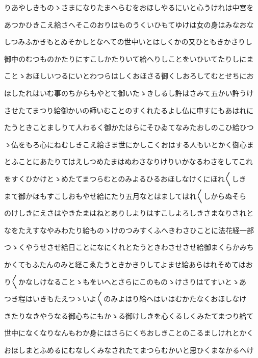 \documentclass[a4paper,11pt,landscape]{ltjtarticle}
\begin{document}
\par\medskip
りあやしきものゝさまになりたまへらむをおほしやるにいと心うけれは中宮を
\par\medskip
あつかひきこえ給さへそこのおりはものうくいひもてゆけは女の身はみなおな
\par\medskip
しつみふかきもとゐそかしとなへての世中いとはしくかの又ひともきかさりし
\par\medskip
御中のむつものかたりにすこしかたりいて給へりしことをいひいてたりしにま
\par\medskip
ことゝおほしいつるにいとわつらはしくおほさる御くしおろしてむとせちにお
\par\medskip
ほしたれはいむ事のちからもやとて御いたゝきしるし許はさみて五かい許うけ
\par\medskip
させたてまつり給御かいの師いむことのすくれたるよし仏に申すにもあはれに
\par\medskip
たうときことましりて人わるく御かたはらにそひゐてなみたおしのこひ給ひつ
\par\medskip
ゝ仏をもろ心にねむしきこえ給さま世にかしこくおはする人もいとかく御心ま
\par\medskip
とふことにあたりてはえしつめたまはぬわさなりけりいかなるわさをしてこれ
\par\medskip
をすくひかけとゝめたてまつらむとのみよるひるおほしなけくにほれ〱しき
\par\medskip
まて御かほもすこしおもやせ給にたり五月なとはましてはれ〱しからぬそら
\par\medskip
のけしきにえさはやきたまはねとありしよりはすこしよろしきさまなりされと
\par\medskip
なをたえすなやみわたり給ものゝけのつみすくふへきわさひことに法花経一部
\par\medskip
つゝくやうせさせ給日ことになにくれとたうときわさせさせ給御まくらかみち
\par\medskip
かくてもふたんのみと経こゑたうときかきりしてよませ給あらはれそめてはお
\par\medskip
り〱かなしけなることゝもをいへとさらにこのものゝけさりはてすいとゝあ
\par\medskip
つき程はいきもたえつゝいよ〱のみよはり給へはいはむかたなくおほしなけ
\par\medskip
きたりなきやうなる御心ちにもかゝる御けしきを心くるしくみたてまつり給て
\par\medskip
世中になくなりなんもわか身にはさらにくちおしきことのこるましけれとかく
\par\medskip
おほしまとふめるにむなしくみなされたてまつらむかいと思ひくまなかるへけ
\par\medskip
\end{document}
